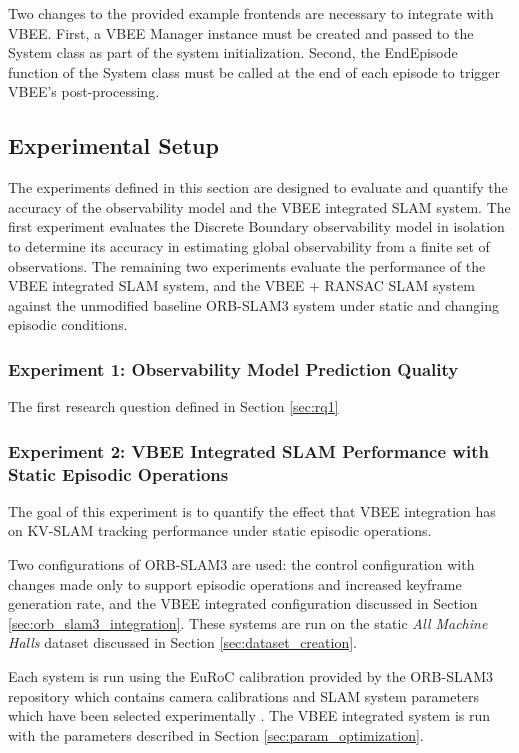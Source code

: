 Two changes to the provided example frontends are necessary to integrate with VBEE. First, a VBEE Manager instance must be created and passed to the System class as part of the system initialization. Second, the EndEpisode function of the System class must be called at the end of each episode to trigger VBEE's post-processing.

\subsection{Experimental Setup}

The experiments defined in this section are designed to evaluate and quantify the accuracy of the observability model and the VBEE integrated SLAM system. The first experiment evaluates the Discrete Boundary observability model in isolation to determine its accuracy in estimating global observability from a finite set of observations. The remaining two experiments evaluate the performance of the VBEE integrated SLAM system, and the VBEE + RANSAC SLAM system against the unmodified baseline ORB-SLAM3 system under static and changing episodic conditions.

\subsubsection*{Experiment 1: Observability Model Prediction Quality}

The first research question defined in Section \ref{sec:rq1}

\subsubsection*{Experiment 2: VBEE Integrated SLAM Performance with Static Episodic Operations}
The goal of this experiment is to quantify the effect that VBEE integration has on KV-SLAM tracking performance under static episodic operations.

Two configurations of ORB-SLAM3 are used: the control configuration with changes made only to support episodic operations and increased keyframe generation rate, and the VBEE integrated configuration discussed in Section \ref{sec:orb_slam3_integration}. These systems are run on the static \textit{All Machine Halls} dataset discussed in Section \ref{sec:dataset_creation}.

Each system is run using the EuRoC calibration provided by the ORB-SLAM3 repository which contains camera calibrations and SLAM system parameters which have been selected experimentally \cite{mur-artalORBSLAMVersatileAccurate2015}. %
The VBEE integrated system is run with the parameters described in Section \ref{sec:param_optimization}.

